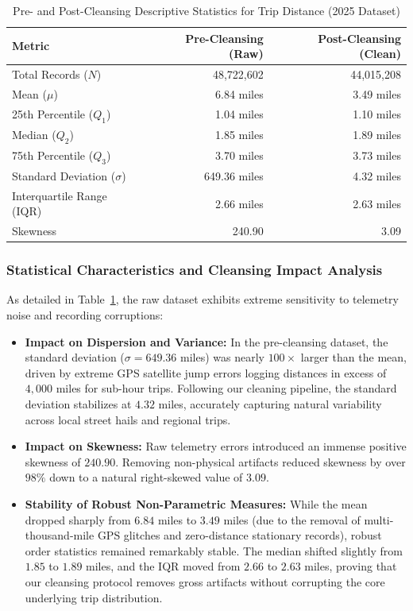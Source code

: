 \documentclass[11pt,a4paper]{article}
\begin{document}
\begin{table}[htbp]
\centering
\caption{Pre- and Post-Cleansing Descriptive Statistics for Trip Distance (2025 Dataset)}
\label{tab:stats_trip_distance_comparison}
\small
\begin{tabular}{lrr}
\toprule
\textbf{Metric} & \textbf{Pre-Cleansing (Raw)} & \textbf{Post-Cleansing (Clean)} \\
\midrule
Total Records ($N$) & 48,722,602 & 44,015,208 \\
Mean ($\mu$) & 6.84 miles & 3.49 miles \\
25th Percentile ($Q_1$) & 1.04 miles & 1.10 miles \\
Median ($Q_2$) & 1.85 miles & 1.89 miles \\
75th Percentile ($Q_3$) & 3.70 miles & 3.73 miles \\
Standard Deviation ($\sigma$) & 649.36 miles & 4.32 miles \\
Interquartile Range (IQR) & 2.66 miles & 2.63 miles \\
Skewness & 240.90 & 3.09 \\
\bottomrule
\end{tabular}
\end{table}

\subsubsection{Statistical Characteristics and Cleansing Impact Analysis}
As detailed in Table~\ref{tab:stats_trip_distance_comparison}, the raw dataset exhibits extreme sensitivity to telemetry noise and recording corruptions:
\begin{itemize}
    \item \textbf{Impact on Dispersion and Variance:} In the pre-cleansing dataset, the standard deviation ($\sigma = 649.36$ miles) was nearly $100\times$ larger than the mean, driven by extreme GPS satellite jump errors logging distances in excess of $4,000$ miles for sub-hour trips. Following our cleaning pipeline, the standard deviation stabilizes at $4.32$ miles, accurately capturing natural variability across local street hails and regional trips.
    \item \textbf{Impact on Skewness:} Raw telemetry errors introduced an immense positive skewness of $240.90$. Removing non-physical artifacts reduced skewness by over $98\%$ down to a natural right-skewed value of $3.09$.
    \item \textbf{Stability of Robust Non-Parametric Measures:} While the mean dropped sharply from $6.84$ miles to $3.49$ miles (due to the removal of multi-thousand-mile GPS glitches and zero-distance stationary records), robust order statistics remained remarkably stable. The median shifted slightly from $1.85$ to $1.89$ miles, and the IQR moved from $2.66$ to $2.63$ miles, proving that our cleansing protocol removes gross artifacts without corrupting the core underlying trip distribution.
\end{itemize}
\end{document}
